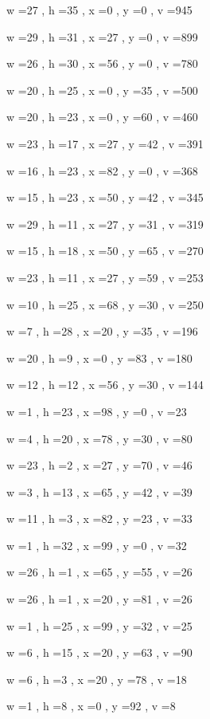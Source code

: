 \documentclass[11pt]{article}
\begin{document}
w =27 , h =35 , x =0 , y =0 , v =945
\par
w =29 , h =31 , x =27 , y =0 , v =899
\par
w =26 , h =30 , x =56 , y =0 , v =780
\par
w =20 , h =25 , x =0 , y =35 , v =500
\par
w =20 , h =23 , x =0 , y =60 , v =460
\par
w =23 , h =17 , x =27 , y =42 , v =391
\par
w =16 , h =23 , x =82 , y =0 , v =368
\par
w =15 , h =23 , x =50 , y =42 , v =345
\par
w =29 , h =11 , x =27 , y =31 , v =319
\par
w =15 , h =18 , x =50 , y =65 , v =270
\par
w =23 , h =11 , x =27 , y =59 , v =253
\par
w =10 , h =25 , x =68 , y =30 , v =250
\par
w =7 , h =28 , x =20 , y =35 , v =196
\par
w =20 , h =9 , x =0 , y =83 , v =180
\par
w =12 , h =12 , x =56 , y =30 , v =144
\par
w =1 , h =23 , x =98 , y =0 , v =23
\par
w =4 , h =20 , x =78 , y =30 , v =80
\par
w =23 , h =2 , x =27 , y =70 , v =46
\par
w =3 , h =13 , x =65 , y =42 , v =39
\par
w =11 , h =3 , x =82 , y =23 , v =33
\par
w =1 , h =32 , x =99 , y =0 , v =32
\par
w =26 , h =1 , x =65 , y =55 , v =26
\par
w =26 , h =1 , x =20 , y =81 , v =26
\par
w =1 , h =25 , x =99 , y =32 , v =25
\par
w =6 , h =15 , x =20 , y =63 , v =90
\par
w =6 , h =3 , x =20 , y =78 , v =18
\par
w =1 , h =8 , x =0 , y =92 , v =8
\par
\newpage


\end{document}
